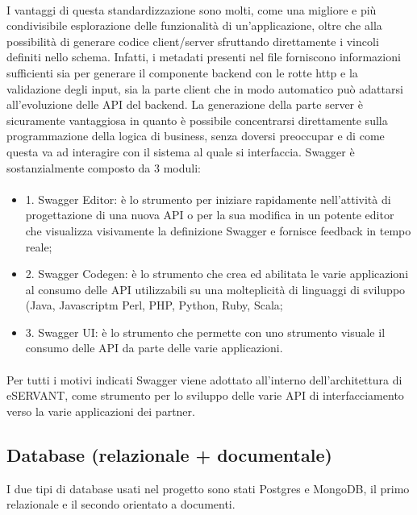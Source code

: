 \paragraph{}

I vantaggi di questa standardizzazione sono molti, come una migliore e più condivisibile
esplorazione delle funzionalità di un’applicazione, oltre che alla possibilità di
generare codice client/server sfruttando direttamente i vincoli definiti nello schema. Infatti, i metadati presenti nel file forniscono informazioni sufficienti sia per
generare il componente backend con le rotte http e la validazione degli input, sia la parte client che in modo automatico può adattarsi all’evoluzione delle API del backend. La generazione della parte server è sicuramente vantaggiosa in quanto è possibile concentrarsi direttamente sulla programmazione della logica di business, senza doversi preoccupar e di come questa va ad interagire con il sistema al quale si interfaccia. Swagger è sostanzialmente composto da 3 moduli: 
\paragraph{}
\begin{itemize}
\item 1. Swagger Editor: è lo strumento per iniziare rapidamente nell’attività di
progettazione di una nuova API o per la sua modifica in un potente editor che
visualizza visivamente la definizione Swagger e fornisce feedback in tempo
reale;
\item 2. Swagger Codegen: è lo strumento che crea ed abilitata le varie applicazioni al
consumo delle API utilizzabili su una molteplicità di linguaggi di sviluppo (Java,
Javascriptm Perl, PHP, Python, Ruby, Scala;
\item 3. Swagger UI: è lo strumento che permette con uno strumento visuale il
consumo delle API da parte delle varie applicazioni.
\end{itemize}


\paragraph{}

Per tutti i motivi indicati Swagger viene adottato all’interno dell’architettura di
eSERVANT, come strumento per lo sviluppo delle varie API di interfacciamento verso
la varie applicazioni dei partner.


\subsection{Database (relazionale + documentale)}
I due tipi di database usati nel progetto sono stati Postgres e MongoDB, il primo relazionale e il secondo orientato a documenti.
